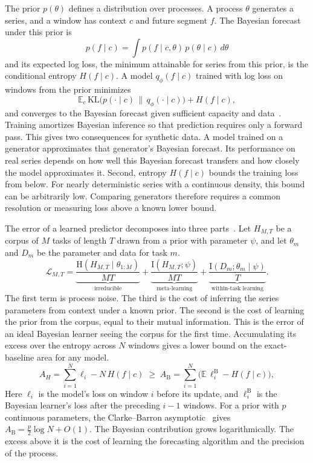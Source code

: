 \documentclass[11pt]{article}
\begin{document}
The prior $p(\theta)$ defines a distribution over processes. A process $\theta$
generates a series, and a window has context $c$ and future segment $f$.
The Bayesian forecast under this prior is
\[
p(f\mid c)=\int p(f\mid c,\theta)\,p(\theta\mid c)\,d\theta
\]
and its expected log loss, the minimum attainable for series from this prior, is
the conditional entropy $H(f\mid c)$. A model $q_\phi(f\mid c)$ trained with log loss
on windows from the prior minimizes
\[
\mathbb{E}_{c}\,\mathrm{KL}\bigl(p(\cdot\mid c)\,\|\,q_\phi(\cdot\mid c)\bigr)+H(f\mid c),
\]
and converges to the Bayesian forecast given sufficient capacity and
data~\citep{muller2022}. Training amortizes Bayesian inference so that prediction
requires only a forward pass. This gives two consequences for synthetic data.
A model trained on a generator approximates that generator's Bayesian forecast.
Its performance on real series depends on how well this Bayesian forecast transfers
and how closely the model approximates it. Second, entropy $H(f\mid c)$ bounds the
training loss from below. For nearly deterministic series with a continuous density,
this bound can be arbitrarily low. Comparing generators therefore requires a common
resolution or measuring loss above a known lower bound.

The error of a learned predictor decomposes into three parts~\citep{jeon2024}.
Let $H_{M,T}$ be a corpus of $M$ tasks of length $T$ drawn from a prior with parameter
$\psi$, and let $\theta_m$ and $D_m$ be the parameter and data for task $m$.
\[
\mathcal{L}_{M,T}
=\underbrace{\frac{\mathrm{H}(H_{M,T}\mid\theta_{1:M})}{MT}}_{\text{irreducible}}
+\underbrace{\frac{\mathrm{I}(H_{M,T};\psi)}{MT}}_{\text{meta-learning}}
+\underbrace{\frac{\mathrm{I}(D_m;\theta_m\mid\psi)}{T}}_{\text{within-task learning}}.
\]
The first term is process noise. The third is the cost of inferring the series
parameters from context under a known prior. The second is the cost of learning the
prior from the corpus, equal to their mutual information. This is the error of an
ideal Bayesian learner seeing the corpus for the first time. Accumulating its excess
over the entropy across $N$ windows gives a lower bound on the exact-baseline area
for any model.
\[
A_{H}=\sum_{i=1}^{N}\ell_i-N\,H(f\mid c)\;\ge\;
A_{\mathrm{B}}=\sum_{i=1}^{N}\bigl(\mathbb{E}\,\ell^{\mathrm{B}}_i-H(f\mid c)\bigr),
\]
Here $\ell_i$ is the model's loss on window $i$ before its update, and
$\ell^{\mathrm{B}}_i$ is the Bayesian learner's loss after the preceding $i-1$
windows. For a prior with $p$ continuous parameters, the Clarke--Barron
asymptotic~\citep{clarke1990} gives $A_{\mathrm{B}}=\tfrac{p}{2}\log N+O(1)$.
The Bayesian contribution grows logarithmically. The excess above it is the cost
of learning the forecasting algorithm and the precision of the process.
\end{document}
